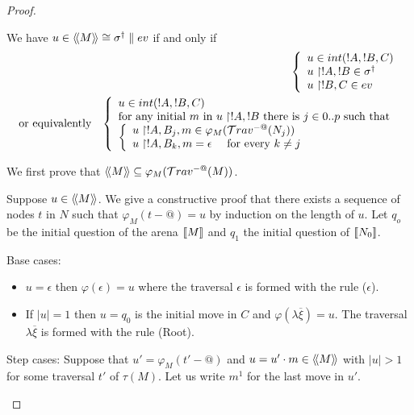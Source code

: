 \begin{proof}
\begin{itemize}
    We have $u \in {\langle\!\langle M \rangle\!\rangle} \cong \sigma^{\dag} \parallel ev$ if and only if
    \begin{eqnarray*}
      &&      \left\{
            \begin{array}{ll}
                u \in int(!A,!B,C)\\
                u \upharpoonright !A,!B  \in \sigma^\dagger \\
                u \upharpoonright !B,C  \in  ev
            \end{array}
            \right. \\
    & \mbox{or equivalently} & \left\{
    \begin{array}{ll}
        u \in int(!A,!B,C) \\
        \hbox{for any initial $m$ in $u \upharpoonright !A,!B$ there is $j \in 0..p$ such that } \\
        \left\{\begin{array}{ll}
            u \upharpoonright !A,B_j, m \in \varphi_{M} (\mathcal{T}rav^{-@}(N_j)) \label{eq:def_z} \\
            u \upharpoonright !A, B_k,m = \epsilon \quad \mbox{ for every } k\neq j \label{eq:b}
        \end{array}
        \right.
    \end{array}
    \right.
    \end{eqnarray*}


    We first prove that ${\langle\!\langle M \rangle\!\rangle} \subseteq \varphi_{M}( \mathcal{T}rav^{-@}(M)
    )$.


    Suppose $u \in {\langle\!\langle M \rangle\!\rangle}$. We give a constructive proof that
    there exists a sequence of nodes $t$ in $N$ such that $\varphi_M(t-@) = u$ by induction on the length of $u$.
    Let $q_o$ be the initial question of the arena ${[\![ M ]\!]}$ and $q_1$ the initial question of ${[\![ N_0 ]\!]}$.

    Base cases:
    \begin{itemize}
    \item $u=\epsilon$ then $\varphi(\epsilon) = u$ where the traversal $\epsilon$ is formed with the rule ($\epsilon$).
    \item If $|u|=1$ then $u=q_0$ is the initial move in $C$ and $\varphi(\lambda \overline{\xi}) = u$. The traversal
    $\lambda \overline{\xi}$ is formed with the rule (Root).
    \end{itemize}

    Step cases: Suppose that $u' = \varphi_M(t'-@)$ and $u = u' \cdot m \in {\langle\!\langle M \rangle\!\rangle}$ with $|u|>1$ for some traversal $t'$ of $\tau(M)$.
    Let us write $m^1$ for the last move in $u'$.


\end{itemize}
\end{proof}
